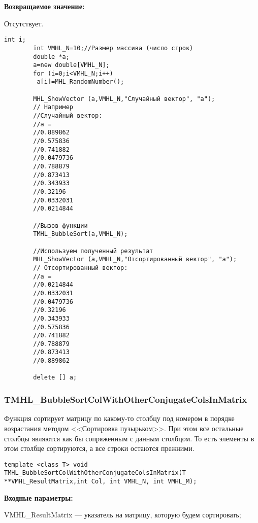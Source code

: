 \documentclass[a4paper,12pt]{article}
\begin{document}
\textbf{Возвращаемое значение:}

Отсутствует.


\begin{lstlisting}[label=code_use_TMHL_BubbleSort,caption=Пример использования]
        int i;
        int VMHL_N=10;//Размер массива (число строк)
        double *a;
        a=new double[VMHL_N];
        for (i=0;i<VMHL_N;i++)
         a[i]=MHL_RandomNumber();

        MHL_ShowVector (a,VMHL_N,"Случайный вектор", "a");
        // Например
        //Случайный вектор:
        //a =
        //0.889862
        //0.575836
        //0.741882
        //0.0479736
        //0.788879
        //0.873413
        //0.343933
        //0.32196
        //0.0332031
        //0.0214844

        //Вызов функции
        TMHL_BubbleSort(a,VMHL_N);

        //Используем полученный результат
        MHL_ShowVector (a,VMHL_N,"Отсортированный вектор", "a");
        // Отсортированный вектор:
        //a =
        //0.0214844
        //0.0332031
        //0.0479736
        //0.32196
        //0.343933
        //0.575836
        //0.741882
        //0.788879
        //0.873413
        //0.889862

        delete [] a;
\end{lstlisting}

\subsubsection{TMHL\_BubbleSortColWithOtherConjugateColsInMatrix}\label{TMHL_BubbleSortColWithOtherConjugateColsInMatrix}

Функция сортирует матрицу по какому-то столбцу под номером в порядке возрастания методом <<Сортировка пузырьком>>. При этом все остальные столбцы являются как бы сопряженным с данным столбцом. То есть элементы в этом столбце сортируются, а все строки остаются прежними.


\begin{lstlisting}[label=code_syntax_TMHL_BubbleSortColWithOtherConjugateColsInMatrix,caption=Синтаксис]
template <class T> void TMHL_BubbleSortColWithOtherConjugateColsInMatrix(T **VMHL_ResultMatrix,int Col, int VMHL_N, int VMHL_M);
\end{lstlisting}

\textbf{Входные параметры:}
 
VMHL\_ResultMatrix --- указатель на матрицу, которую будем сортировать;
 
\end{document}
